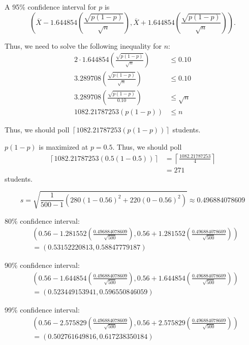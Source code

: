 \documentclass[12pt]{article}
\begin{document}
\medskip
{} A 95\% confidence interval for $p$ is
$$\left(\overline X - 1.644854\left(\frac{\sqrt{p(1-p)}}{\sqrt n}\right), \overline X + 1.644854\left(\frac{\sqrt{p(1-p)}}{\sqrt n}\right) \right).$$

Thus, we need to solve the following inequality for $n$:
\begin{align*}
    2 \cdot 1.644854\left(\frac{\sqrt{p(1-p)}}{\sqrt n}\right) &\leq 0.10 \\
    3.289708\left(\frac{\sqrt{p(1-p)}}{\sqrt n}\right) &\leq 0.10 \\
    3.289708\left(\frac{\sqrt{p(1-p)}}{0.10}\right) &\leq \sqrt n \\
    1082.21787253(p(1-p)) &\leq n
\end{align*}

Thus, we should poll $\left\lceil 1082.21787253(p(1-p)) \right\rceil$ students.

\medskip
{} $p(1-p)$ is maximized at $p=0.5$. Thus, we should poll
\begin{align*}
    \left\lceil 1082.21787253(0.5(1-0.5)) \right\rceil &= \left\lceil \frac{1082.21787253}4 \right\rceil \\
                                                            &= 271
\end{align*} students.

\medskip
{} $$s = \sqrt{\frac1{500-1}\left(280(1-0.56)^2 + 220(0-0.56)^2\right)} \approx 0.496884078609$$


80\% confidence interval:
\begin{align*}
    & \left(0.56 - 1.281552\left(\frac{0.496884078609}{\sqrt{500}}\right), 0.56 + 1.281552\left(\frac{0.496884078609}{\sqrt{500}}\right) \right) \\
    &= (0.53152220813, 0.58847779187)
\end{align*}

90\% confidence interval:
\begin{align*}
    & \left(0.56 - 1.644854\left(\frac{0.496884078609}{\sqrt{500}}\right), 0.56 + 1.644854\left(\frac{0.496884078609}{\sqrt{500}}\right) \right) \\
    &= (0.523449153941, 0.596550846059)
\end{align*}

99\% confidence interval:
\begin{align*}
    & \left(0.56 - 2.575829\left(\frac{0.496884078609}{\sqrt{500}}\right), 0.56 + 2.575829\left(\frac{0.496884078609}{\sqrt{500}}\right) \right) \\
    &= (0.502761649816, 0.617238350184)
\end{align*}
\end{document}
